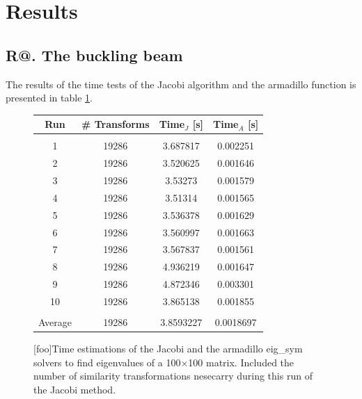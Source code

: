 \documentclass[%
reprint,
amsmath,amssymb,
aps,
]{revtex4-1}
\makeatletter
\newcommand*{\rom}[1]{\expandafter\@slowromancap\romannumeral #1@}
\makeatother
\begin{document}
\newpage 
\section*{Results}
\subsection*{R\rom{1}. The buckling beam} \noindent 
The results of the time tests of the Jacobi algorithm and the armadillo function is presented in table \ref{tab1}.
\begin{figure}[H]
	\centering 
	\begin{tabular} {|c|c|c|c|}
		\hline
		Run & \# Transforms & Time$_J$ [s] & Time$_A$ [s] \\ 
		\hline
		&&& \\ 
		1 & 19286 & 3.687817             & 0.002251            \\ 
		2 & 19286 & 3.520625             & 0.001646            \\ 
		3 & 19286 & 3.53273             & 0.001579            \\ 
		4 & 19286 & 3.51314             & 0.001565            \\ 
		5 & 19286 & 3.536378             & 0.001629            \\ 
		6 & 19286 & 3.560997             & 0.001663            \\ 
		7 & 19286 & 3.567837             & 0.001561            \\ 
		8 & 19286 & 4.936219             & 0.001647            \\ 
		9 & 19286 & 4.872346             & 0.003301            \\ 
		10 & 19286 & 3.865138             & 0.001855            \\ 
		\hline 
		& && \\
		Average &19286& 3.8593227&0.0018697\\ 
		\hline
	\end{tabular}
	[foo]{Time estimations of the Jacobi and the armadillo eig\_sym solvers to find eigenvalues of a 100$\times$100 matrix. Included the number of similarity transformations nesecarry during this run of the Jacobi method. \label{tab1}}
\end{figure}
\end{document}
